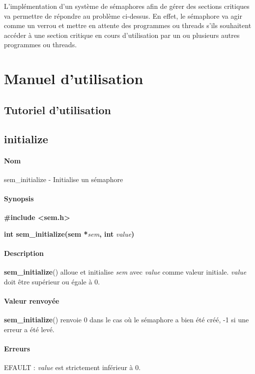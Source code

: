 \documentclass[12pt]{article}
\begin{document}
    L'implémentation d'un système de sémaphores afin de gérer des sections critiques va permettre de répondre au problème ci-dessus. En effet, le sémaphore va agir comme un verrou et mettre en attente des programmes ou threads s'ils souhaitent accéder à une section critique en cours d'utilisation par un ou plusieurs autres programmes ou threads.


\newpage
\section{Manuel d'utilisation}
    \subsection{Tutoriel d'utilisation}
    \newpage
    \subsection{initialize}
        \paragraph{Nom\\}
        sem\_initialize - Initialise un sémaphore
        \paragraph{Synopsis\\}
        \textbf{\#include <sem.h>}

        \textbf{int sem\_initialize(sem *}\textit{sem}\textbf{, int }\textit{value}\textbf{)}
        \paragraph{Description\\}
        \textbf{sem\_initialize}() alloue et initialise \textit{sem} avec \textit{value} comme valeur initiale. \textit{value} doit être supérieur ou égale à 0.

        \paragraph{Valeur renvoyée\\}
        \textbf{sem\_initialize}() renvoie 0 dans le cas où le sémaphore a bien été créé, -1 si une erreur a été levé.
        \paragraph{Erreurs\\}
        EFAULT : \textit{value} est strictement inférieur à 0.
    \newpage
\end{document}

